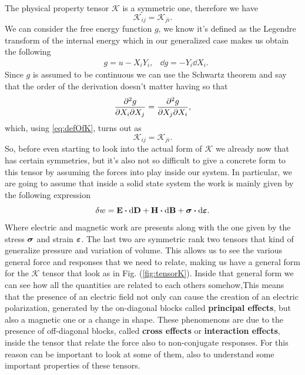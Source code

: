 {
    The physical property tensor $\mathcal{K}$ is a symmetric one, therefore we have
    \begin{equation}
        \mathcal{K}_{ij} = \mathcal{K}_{ji}.
    \end{equation}
}
{
    We can consider the free energy function $g$, we know it's defined as the Legendre transform of the internal energy which in our generalized case makes us obtain the following
    \begin{align}
        &g = u - X_iY_i, &\dd g = -Y_i\dd X_i.
    \end{align}
    Since $g$ is assumed to be continuous we can use the Schwartz theorem and say that the order of the derivation doesn't matter having so that
    \begin{equation}
        \pderivative{g}{X_i}{X_j} = \pderivative{g}{X_j}{X_i},
    \end{equation}
    which, using \eqref{eq:defOfK}, turns out as
    \begin{equation}
        \mathcal{K}_{ij} = \mathcal{K}_{ji}.
    \end{equation}
}
So, before even starting to look into the actual form of $\mathcal{K}$ we already now that has certain symmetries, but it's also not so difficult to give a concrete form to this tensor by assuming the forces into play inside our system. In particular, we are going to assume that inside a solid state system the work is mainly given by the following expression
\begin{equation}
    \delta w = \vb{E}\vdot\dd\vb{D} + \vb{H}\vdot\dd\vb{B} + \vb*{\sigma}\vdot\dd\vb*{\varepsilon}.
\end{equation}
Where electric and magnetic work are presents along with the one given by the stress $\vb*{\sigma}$ and strain $\vb*{\varepsilon}$. The last two are symmetric rank two tensors that kind of generalize pressure and variation of volume. This allows us to see the various general force and responses that we need to relate, making us have a general form for the $\mathcal{K}$ tensor that look as in Fig. (\ref{fig:tensorK}). Inside that general form we can see how all the quantities are related to each others somehow,This means that the presence of an electric field not only can cause the creation of an electric polarization, generated by the on-diagonal blocks called \textbf{principal effects}, but also a magnetic one or a change in shape. These phenomenons are due to the presence of off-diagonal blocks, called \textbf{cross effects} or \textbf{interaction effects}, inside the tensor that relate the force also to non-conjugate responses. For this reason can be important to look at some of them, also to understand some important properties of these tensors. 

